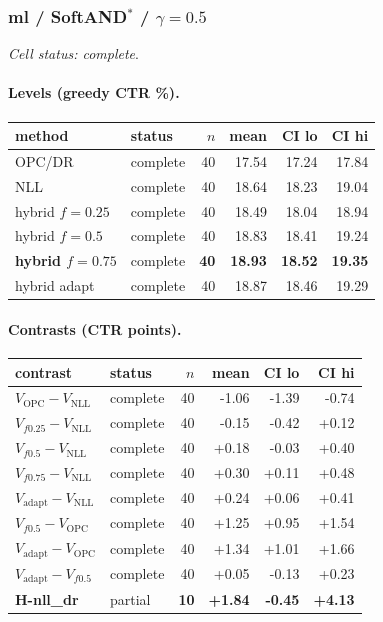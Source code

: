 \documentclass[10pt,a4paper]{article}
\begin{document}
\subsubsection{ml / SoftAND$^*$ / $\gamma=0.5$}
\emph{Cell status: complete}.
\paragraph{Levels (greedy CTR \%).}
{\centering\small\begin{tabular}{llrrrr}
\toprule method & status & $n$ & mean & CI lo & CI hi \\
\midrule
OPC/DR & complete & 40 & 17.54 & 17.24 & 17.84 \\
NLL & complete & 40 & 18.64 & 18.23 & 19.04 \\
hybrid $f{=}0.25$ & complete & 40 & 18.49 & 18.04 & 18.94 \\
hybrid $f{=}0.5$ & complete & 40 & 18.83 & 18.41 & 19.24 \\
\textbf{hybrid $f{=}0.75$} & complete & \textbf{40} & \textbf{18.93} & \textbf{18.52} & \textbf{19.35} \\
hybrid adapt & complete & 40 & 18.87 & 18.46 & 19.29 \\
\bottomrule\end{tabular}\par}
\paragraph{Contrasts (CTR points).}
{\centering\small\begin{tabular}{llrrrr}
\toprule contrast & status & $n$ & mean & CI lo & CI hi \\
\midrule
$V_{\mathrm{OPC}}-V_{\mathrm{NLL}}$ & complete & 40 & -1.06 & -1.39 & -0.74 \\
$V_{f0.25}-V_{\mathrm{NLL}}$ & complete & 40 & -0.15 & -0.42 & +0.12 \\
$V_{f0.5}-V_{\mathrm{NLL}}$ & complete & 40 & +0.18 & -0.03 & +0.40 \\
$V_{f0.75}-V_{\mathrm{NLL}}$ & complete & 40 & +0.30 & +0.11 & +0.48 \\
$V_{\mathrm{adapt}}-V_{\mathrm{NLL}}$ & complete & 40 & +0.24 & +0.06 & +0.41 \\
$V_{f0.5}-V_{\mathrm{OPC}}$ & complete & 40 & +1.25 & +0.95 & +1.54 \\
$V_{\mathrm{adapt}}-V_{\mathrm{OPC}}$ & complete & 40 & +1.34 & +1.01 & +1.66 \\
$V_{\mathrm{adapt}}-V_{f0.5}$ & complete & 40 & +0.05 & -0.13 & +0.23 \\
\textbf{H-nll\_dr} & partial & \textbf{10} & \textbf{+1.84} & \textbf{-0.45} & \textbf{+4.13} \\
\bottomrule\end{tabular}\par}
\end{document}
